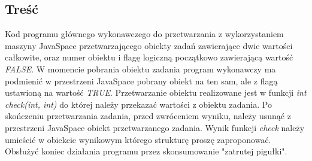 	\subsection{Treść}
		Kod programu głównego wykonawczego do przetwarzania z wykorzystaniem maszyny JavaSpace przetwarzającego obiekty zadań zawierające dwie wartości całkowite, oraz numer obiektu i flagę logiczną początkowo zawierającą wartość \textit{FALSE}. W momencie pobrania obiektu zadania program wykonawczy ma podmienić w przestrzeni JavaSpace pobrany obiekt na ten sam, ale z flagą ustawioną na wartość \textit{TRUE}. Przetwarzanie obiektu realizowane jest w funkcji \textit{int check(int, int)} do której należy przekazać wartości z obiektu zadania. Po skończeniu przetwarzania zadania, przed zwróceniem wyniku, należy usunąć z przestrzeni JavaSpace obiekt przetwarzanego zadania. Wynik funkcji \textit{check} należy umieścić w obiekcie wynikowym którego strukturę proszę zaproponować. Obsłużyć koniec działania programu przez skonsumowanie "zatrutej pigułki".
